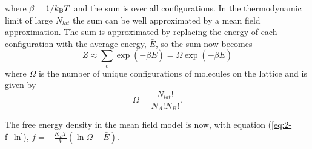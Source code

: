 where $\beta = 1/k_{\rm B} T$ and the sum is over all configurations. In the thermodynamic limit of large $N_{lat}$ the sum can be well approximated by a mean field approximation. The sum is approximated by replacing the energy of each configuration with the average energy, $\bar{E}$, so the sum now becomes
\begin{equation}
    Z \approx \sum_c \exp(-\beta \bar{E}) = \Omega \exp(-\beta \bar{E})
\end{equation}
where $\Omega$ is the number of unique configurations of molecules on the lattice and is given by
\begin{equation}
    \Omega = \frac{N_{lat}!}{N_A! N_B!}.
\end{equation}

The free energy density in the mean field model is now, with equation (\ref{eq:2-f_ln}), $f = -\frac{K_B T}{V} (\ln \Omega + \bar{E})$.

